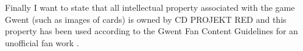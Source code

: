 \documentclass[journal]{IEEEtran}
\begin{document}
Finally I want to state that all intellectual property associated with the game Gwent (such as images of cards) is owned by CD PROJEKT RED and this property has been used according to the Gwent Fan Content Guidelines for an unofficial fan work \cite{cdp}.



%



\end{document}
